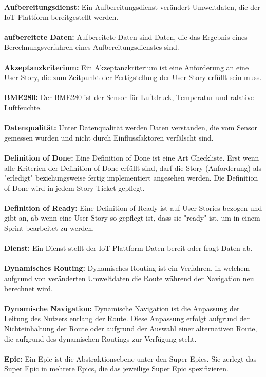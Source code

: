 \textbf{Aufbereitungsdienst:}  Ein Aufbereitungsdienst verändert Umweltdaten, die der IoT-Plattform bereitgestellt werden.\\
\\
\textbf{aufbereitete Daten:} Aufbereitete Daten sind Daten, die das Ergebnis eines Berechnungsverfahren eines Aufbereitungsdienstes sind. \\
\\
\textbf{Akzeptanzkriterium:} Ein Akzeptanzkriterium ist eine Anforderung an eine User-Story, die zum Zeitpunkt der Fertigstellung der User-Story erfüllt sein muss. \\
\\
\textbf{BME280:} Der BME280 ist der Sensor für Luftdruck, Temperatur und ralative Luftfeuchte. \\
\\
\textbf{Datenqualität:}  Unter Datenqualität werden Daten verstanden, die vom Sensor gemessen wurden und nicht durch Einflussfaktoren verfälscht sind.\\
\\
\textbf{Definition of Done:} Eine Definition of Done ist eine Art Checkliste. Erst wenn alle Kriterien der Definition of Done erfüllt sind, darf die Story (Anforderung) als "erledigt" beziehungsweise fertig implementiert angesehen werden. Die Definition of Done wird in jedem Story-Ticket gepflegt. \\
\\
\textbf{Definition of Ready:} Eine Definition of Ready ist auf User Stories bezogen und gibt an, ab wenn eine User Story so gepflegt ist, dass sie "ready" ist, um in einem Sprint bearbeitet zu werden.  \\
\\
\textbf{Dienst:}  Ein Dienst stellt der IoT-Plattform Daten bereit oder fragt Daten ab.\\
\\
\textbf{Dynamisches Routing:}
Dynamisches Routing ist ein Verfahren, in welchem aufgrund von veränderten Umweltdaten die Route während der Navigation neu berechnet wird.\\
\\
\textbf{Dynamische Navigation:}
Dynamische Navigation ist die Anpassung der Leitung des Nutzers entlang der Route. Diese Anpassung erfolgt aufgrund der Nichteinhaltung der Route oder aufgrund der Auswahl einer alternativen Route, die aufgrund des dynamischen Routings zur Verfügung steht.\\
\\
\textbf{Epic:} Ein Epic ist die Abstraktionsebene unter den Super Epics. Sie zerlegt das Super Epic in mehrere Epics, die das jeweilige Super Epic spezifizieren. \\
